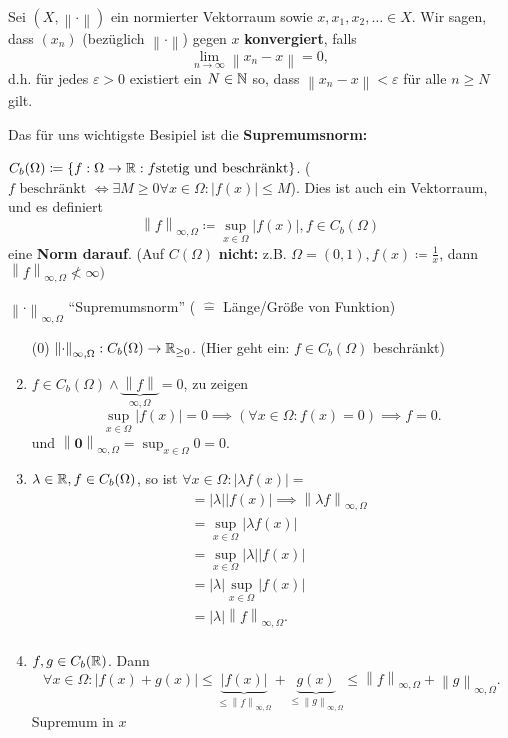 \begin{subdefinition}
	Sei $ \left( X, \left\| \cdot  \right\|  \right)  $ ein normierter Vektorraum sowie $ x, x_1, x_2, \dotsc \in X $. Wir sagen, dass $ \left( x_n \right)  $ (bezüglich $ \left\| \cdot  \right\|  $) gegen $ x $ \textbf{konvergiert}, falls
	\[
		\lim_{n \to \infty} \left\| x_n - x \right\| = 0,
	\]
	d.h. für jedes $ \varepsilon > 0 $ existiert ein $ N \in \mathbb{N}  $ so, dass $ \left\| x_n - x \right\| < \varepsilon  $ für alle $ n \geq N $ gilt.
\end{subdefinition}

Das für uns wichtigste Besipiel ist die \textbf{Supremumsnorm:}
\begin{subexample}[Supremumsnorm]
	$ C_b(\Omega) \coloneqq  \left\{ f: \Omega \to \mathbb{R} : f \text{stetig und beschränkt}  \right\}  $. ($ f \text{ beschränkt } \iff \exists M \geq  0 \forall  x \in  \Omega : | f(x) | \leq M $). Dies ist auch ein Vektorraum, und es definiert
	\[
		\left\| f \right\|_{\infty, \Omega} \coloneqq \sup_{x \in \Omega} | f(x) |, f \in C_b(\Omega) 
	\]
	 eine \textbf{Norm darauf}.
	\begingroup
	\color{blue}
	(Auf $ C(\Omega) $ \textbf{nicht:} z.B. $ \Omega = (0, 1), f(x) \coloneqq \frac{ 1 }{ x }  $, dann $ \left\| f \right\|_{\infty, \Omega} \nless \infty ) $
	\endgroup
\end{subexample}

$ \left\| \cdot  \right\|_{\infty, \Omega} $ ``Supremumsnorm'' ( $ \widehat{=} $ Länge/Größe von Funktion)

\begin{enumerate}[label=(\roman*)]
	\item[(0)] $ \left\| \cdot  \right\|_{\infty, \Omega} : C_b(\Omega) \to  \mathbb{R}_{\geq 0} $. (Hier geht ein: $ f \in C_b(\Omega) $ beschränkt)
\item $ f \in C_b(\Omega) \wedge \underbrace{\left\| f \right\|}_{\infty, \Omega} = 0 $, zu zeigen 
		\[
			\sup_{x \in \Omega} | f(x) | = 0 \implies (\forall x \in  \Omega : f(x) = 0) \implies f = 0.
		\]
		und $ \left\| \mathbf{0} \right\|_{\infty, \Omega} = \sup_{x \in \Omega} 0 = 0 $.
	\item $ \lambda \in \mathbb{R} , f \in C_b(\Omega) $, so ist $ \forall x \in \Omega : | \lambda f(x) | =  $ 
		\begin{align*}
			~&= |\lambda| |f(x)| \implies  \left\| \lambda f \right\|_{\infty, \Omega} \\
			~&= \sup_{x\in \Omega} | \lambda f (x) | \\
			~&= \sup_{x \in \Omega} |\lambda| |f(x)| \\
			~&= |\lambda| \sup_{x \in \Omega} |f(x)| \\
			~&= |\lambda| \left\| f \right\|_{\infty, \Omega}. \\
		\end{align*}
	\item $ f, g \in  C_b(\mathbb{R} ) $.
		Dann
		\[
			\forall x \in \Omega: | f(x) + g(x) |
			\leq \underbrace{|f(x)|}_{\leq \left\| f \right\|_{\infty, \Omega}}
				+ \underbrace{g(x)}_{\leq \left\| g \right\|_{\infty, \Omega}}
			\leq \left\| f \right\|_{\infty, \Omega}
				+ \left\| g \right\|_{\infty, \Omega}.
		\]
		Supremum in $ x $
\end{enumerate}

